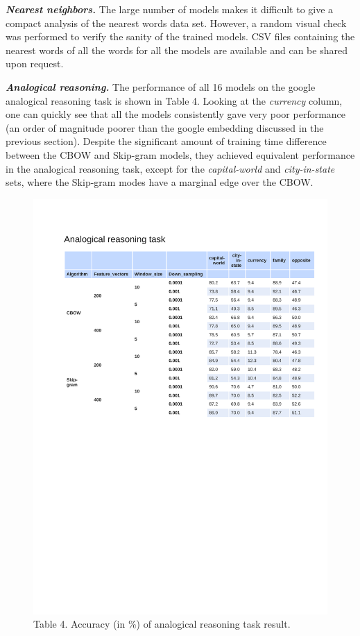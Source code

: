 \documentclass[12pt]{report}
\begin{document}
\noindent\textbf{\emph{Nearest neighbors.}} The large number of models makes it difficult to 
give a compact analysis of the nearest words data set. However, a random visual check was 
performed to verify the sanity of the trained models. CSV files containing the nearest words of all the words for all the models are available and can be shared upon request.

\noindent\textbf{\emph{Analogical reasoning.}} The performance of all 16 models on the google analogical reasoning task is shown in Table 4. Looking at the \emph{currency} column, one can quickly see that all the models consistently gave very poor performance (an order of magnitude
poorer than the google embedding discussed in the previous section). Despite the significant 
amount of training time difference between the CBOW and Skip-gram models, they achieved equivalent performance in the analogical reasoning task, except for the \emph{capital-world} and \emph{city-in-state} sets, where the Skip-gram modes have a marginal edge over the CBOW.

\begin{figure}
	\centering
	\includegraphics[trim=1cm 13cm 0cm 3.25cm, clip=true,width=\textwidth]{./Figures/summary-analogical.pdf}
	\caption*{Table 4. Accuracy (in $\%$) of analogical reasoning task result.}
	\label{fig:ana}
	
\end{figure}
\end{document}
